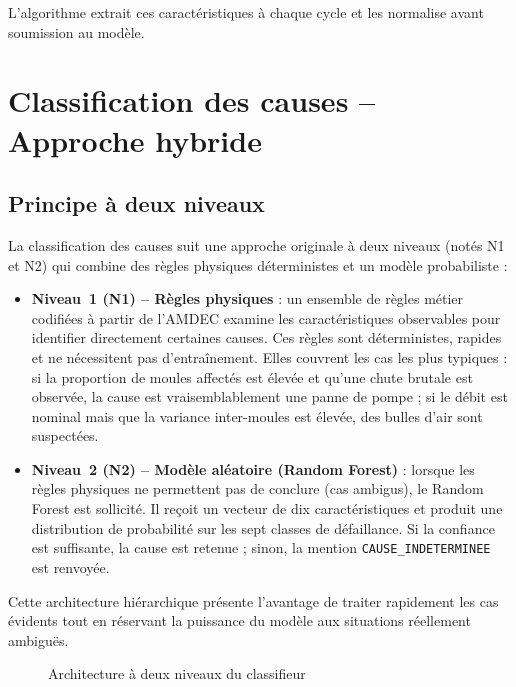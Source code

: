 L'algorithme extrait ces caractéristiques à chaque cycle et les normalise avant soumission au modèle.

\section{Classification des causes -- Approche hybride}

\subsection{Principe à deux niveaux}

La classification des causes suit une approche originale à deux niveaux (notés N1 et N2) qui combine des règles physiques déterministes et un modèle probabiliste :

\begin{itemize}
  \item \textbf{Niveau~1 (N1) -- Règles physiques} : un ensemble de règles métier codifiées à partir de l'AMDEC examine les caractéristiques observables pour identifier directement certaines causes. Ces règles sont déterministes, rapides et ne nécessitent pas d'entraînement. Elles couvrent les cas les plus typiques : si la proportion de moules affectés est élevée et qu'une chute brutale est observée, la cause est vraisemblablement une panne de pompe ; si le débit est nominal mais que la variance inter-moules est élevée, des bulles d'air sont suspectées.
  \item \textbf{Niveau~2 (N2) -- Modèle aléatoire (Random Forest)} : lorsque les règles physiques ne permettent pas de conclure (cas ambigus), le Random Forest est sollicité. Il reçoit un vecteur de dix caractéristiques et produit une distribution de probabilité sur les sept classes de défaillance. Si la confiance est suffisante, la cause est retenue ; sinon, la mention \texttt{CAUSE\_INDETERMINEE} est renvoyée.
\end{itemize}

Cette architecture hiérarchique présente l'avantage de traiter rapidement les cas évidents tout en réservant la puissance du modèle aux situations réellement ambiguës.

\begin{figure}[htbp]
  \centering
  \caption{Architecture à deux niveaux du classifieur}
\end{figure}

